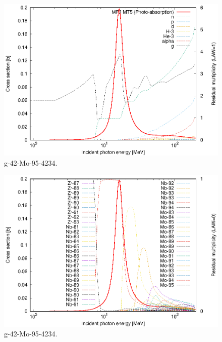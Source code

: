 \begin{figure}
 \includegraphics[width=\linewidth]{eps/g_42-Mo-95_4234.eps}
  \caption{g-42-Mo-95-4234.}
\end{figure}
\begin{figure}
 \includegraphics[width=\linewidth]{eps-law0/g_42-Mo-95_4234.eps}
 \caption{g-42-Mo-95-4234.}
\end{figure}
\newpage \clearpage

